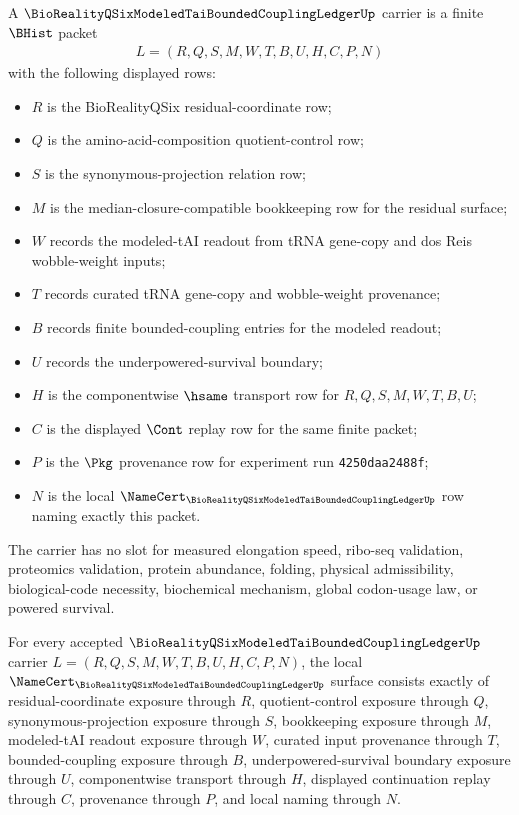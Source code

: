 \begin{definition}
\label{def:bioreality-q-six-modeled-tai-bounded-coupling-ledger-carrier}
A $\BioRealityQSixModeledTaiBoundedCouplingLedgerUp$ carrier is a finite $\BHist$ packet
$$
\begin{gathered}
L=(R,Q,S,M,W,T,B,U,H,C,P,N)
\end{gathered}
$$
with the following displayed rows:
\begin{itemize}
\item $R$ is the BioRealityQSix residual-coordinate row;
\item $Q$ is the amino-acid-composition quotient-control row;
\item $S$ is the synonymous-projection relation row;
\item $M$ is the median-closure-compatible bookkeeping row for the residual surface;
\item $W$ records the modeled-tAI readout from tRNA gene-copy and dos Reis wobble-weight inputs;
\item $T$ records curated tRNA gene-copy and wobble-weight provenance;
\item $B$ records finite bounded-coupling entries for the modeled readout;
\item $U$ records the underpowered-survival boundary;
\item $H$ is the componentwise $\hsame$ transport row for $R,Q,S,M,W,T,B,U$;
\item $C$ is the displayed $\Cont$ replay row for the same finite packet;
\item $P$ is the $\Pkg$ provenance row for experiment run \texttt{4250daa2488f};
\item $N$ is the local $\NameCert_{\BioRealityQSixModeledTaiBoundedCouplingLedgerUp}$ row naming exactly this packet.
\end{itemize}
The carrier has no slot for measured elongation speed, ribo-seq validation, proteomics validation, protein abundance, folding, physical admissibility, biological-code necessity, biochemical mechanism, global codon-usage law, or powered survival.
\end{definition}

\begin{theorem}
\label{thm:bioreality-q-six-modeled-tai-bounded-coupling-ledger-namecert-obligations}
For every accepted $\BioRealityQSixModeledTaiBoundedCouplingLedgerUp$ carrier $L=(R,Q,S,M,W,T,B,U,H,C,P,N)$, the local $\NameCert_{\BioRealityQSixModeledTaiBoundedCouplingLedgerUp}$ surface consists exactly of residual-coordinate exposure through $R$, quotient-control exposure through $Q$, synonymous-projection exposure through $S$, bookkeeping exposure through $M$, modeled-tAI readout exposure through $W$, curated input provenance through $T$, bounded-coupling exposure through $B$, underpowered-survival boundary exposure through $U$, componentwise transport through $H$, displayed continuation replay through $C$, provenance through $P$, and local naming through $N$.
\end{theorem}

